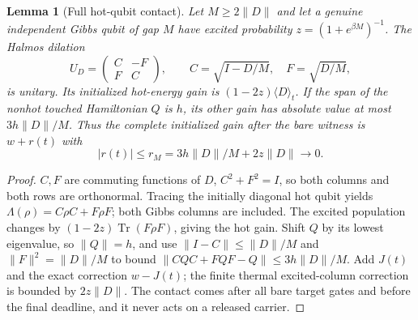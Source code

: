 \documentclass[11pt]{article}
\newtheorem{lemma}[theorem]{Lemma}
\theoremstyle{definition}
\theoremstyle{remark}
\newcommand{\Tr}{\operatorname{Tr}}
\begin{document}
\begin{lemma}[Full hot-qubit contact]\label{sc-lem:hot}
Let $M\ge2\|D\|$ and let a genuine independent Gibbs qubit of gap $M$ have excited probability $z=(1+e^{\beta M})^{-1}$. The Halmos dilation
\[
U_D=\begin{pmatrix}C&-F\\F&C\end{pmatrix},\qquad
C=\sqrt{I-D/M},\quad F=\sqrt{D/M},
\]
is unitary. Its initialized hot-energy gain is $(1-2z)\langle D\rangle_t$. If the span of the nonhot touched Hamiltonian $Q$ is $h$, its other gain has absolute value at most $3h\|D\|/M$. Thus the complete initialized gain after the bare witness is $w+r(t)$ with
\begin{equation}\label{sc-eq:hot}
|r(t)|\le r_M=3h\|D\|/M+2z\|D\|\longrightarrow0.
\end{equation}
\end{lemma}
\begin{proof}
$C,F$ are commuting functions of $D$, $C^2+F^2=I$, so both columns and both rows are orthonormal. Tracing the initially diagonal hot qubit yields $\Lambda(\rho)=C\rho C+F\rho F$; both Gibbs columns are included. The excited population changes by $(1-2z)\Tr(F\rho F)$, giving the hot gain. Shift $Q$ by its lowest eigenvalue, so $\|Q\|=h$, and use $\|I-C\|\le\|D\|/M$ and $\|F\|^2=\|D\|/M$ to bound $\|CQC+FQF-Q\|\le3h\|D\|/M$. Add $J(t)$ and the exact correction $w-J(t)$; the finite thermal excited-column correction is bounded by $2z\|D\|$. The contact comes after all bare target gates and before the final deadline, and it never acts on a released carrier.
\end{proof}
\end{document}

